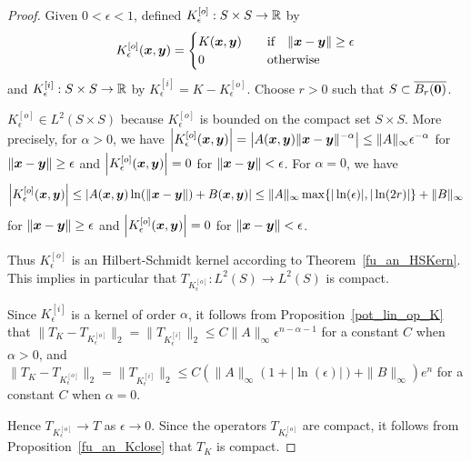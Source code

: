 \begin{proof}
Given $0 < \epsilon <1$, defined
$\displaystyle K_\epsilon^{[o]}:S\times S \rightarrow \mathbb{R}$
by
\[
K_\epsilon^{[o]}({\bm{x}},{\bm{y}}) =
\begin{cases}
K({\bm{x}},{\bm{y}}) & \quad \text{if} \quad 
\|{\bm{x}}-{\bm{y}}\| \geq \epsilon \\
0 & \quad \text{otherwise}
\end{cases}
\]
and $\displaystyle K_\epsilon^{[i]}:S\times S \rightarrow \mathbb{R}$ by
$\displaystyle K_\epsilon^{[i]} = K - K_\epsilon^{[o]}$.  Choose $r>0$
such that $S \subset \overline{B_r({\bm{0}})}$.

 $\displaystyle K_\epsilon^{[o]} \in L^2(S \times S)$ because
$\displaystyle K_\epsilon^{[o]}$ is bounded on the compact set $S \times S$.
More precisely, for $\alpha>0$, we have
$\displaystyle
\left|K_\epsilon^{[o]}({\bm{x}},{\bm{y}})\right| =
\left| A({\bm{x}},{\bm{y}}) \|{\bm{x}} - {\bm{y}} \|^{-\alpha} \right|
\leq \|A\|_{\infty} \epsilon^{-\alpha}$
for $\|{\bm{x}}-{\bm{y}}\| \geq \epsilon$ and
$\displaystyle \left|K_\epsilon^{[o]}({\bm{x}},{\bm{y}})\right| = 0$
for $\|{\bm{x}}-{\bm{y}}\| < \epsilon$.
For $\alpha = 0$, we have
\[
\left|K_\epsilon^{[o]}({\bm{x}},{\bm{y}})\right|
\leq
\left| A({\bm{x}},{\bm{y}}) \ln(\|{\bm{x}} - {\bm{y}} \|) + B({\bm{x}},{\bm{y}})
\right|
\leq \|A\|_{\infty} \max \{ |\ln(\epsilon)|, |\ln(2r)| \} +
\|B\|_\infty
\]
for $\|{\bm{x}}-{\bm{y}}\| \geq \epsilon$ and
$\displaystyle
\left|K_\epsilon^{[o]}({\bm{x}},{\bm{y}})\right| = 0$
for $\|{\bm{x}}-{\bm{y}}\| < \epsilon$.

Thus $\displaystyle K_\epsilon^{[o]}$ is an Hilbert-Schmidt kernel according to
Theorem~\ref{fu_an_HSKern}.  This implies in
particular that $T_{K_\epsilon^{[o]}}:L^2(S) \rightarrow L^2(S)$ is compact.

 Since $\displaystyle K_\epsilon^{[i]}$ is a kernel of order $\alpha$,
it follows from Proposition~\ref{pot_lin_op_K} that
$\displaystyle
\|T_K - T_{K_\epsilon^{[o]}}\|_2 =
\|T_{K_\epsilon^{[i]}}\|_2 \leq C \|A\|_\infty \epsilon^{n-\alpha-1}$
for a constant $C$ when $\alpha>0$, and
$\displaystyle
\|T_K - T_{K_\epsilon^{[o]}}\|_2 =
\|T_{K_\epsilon^{[i]}}\|_2 \leq C \left( \|A\|_\infty
  (1+|\ln(\epsilon)|) + \|B\|_\infty \right) e^{n}$
for a constant $C$ when $\alpha = 0$.

Hence $\displaystyle T_{K_\epsilon^{[o]}} \rightarrow T$ as
$\epsilon \rightarrow 0$.
Since the operators $\displaystyle T_{K_\epsilon^{[o]}}$ are compact,
it follows from Proposition~\ref{fu_an_Kclose} that $T_K$ is compact.
\end{proof}

